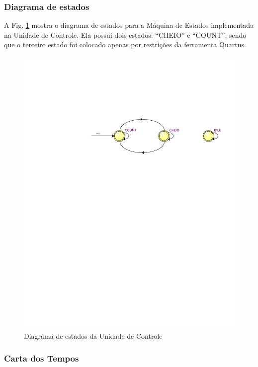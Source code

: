 \documentclass[a4,12pt]{horizon-theme}
\begin{document}
\subsubsection{Diagrama de estados}
\label{sec:uc_estados}

A Fig. \ref{fig:uc_estados} mostra o diagrama de estados para a Máquina de Estados implementada na Unidade de Controle. Ela possui dois estados: ``CHEIO'' e ``COUNT'', sendo que o terceiro estado foi colocado apenas por restrições da ferramenta Quartus.

\begin{figure}[!ht]
    \centering
    \includegraphics[width=\textwidth, trim={65mm, 176mm, 5mm, 60mm}, clip]{uc_estados}
    \caption{Diagrama de estados da Unidade de Controle}
    \label{fig:uc_estados}
\end{figure}





\subsubsection{Carta dos Tempos}
\label{sec:uc_tempos}
\end{document}
